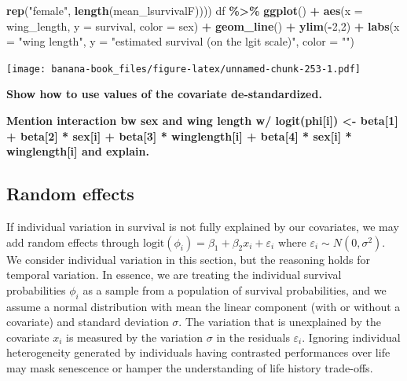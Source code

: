 \documentclass[
  12pt,
]{krantz}
\newenvironment{Shaded}{\begin{snugshade}}{\end{snugshade}}
\newcommand{\AttributeTok}[1]{\textcolor[rgb]{0.13,0.29,0.53}{#1}}
\newcommand{\DecValTok}[1]{\textcolor[rgb]{0.00,0.00,0.81}{#1}}
\newcommand{\FunctionTok}[1]{\textcolor[rgb]{0.13,0.29,0.53}{\textbf{#1}}}
\newcommand{\NormalTok}[1]{#1}
\newcommand{\SpecialCharTok}[1]{\textcolor[rgb]{0.81,0.36,0.00}{\textbf{#1}}}
\newcommand{\StringTok}[1]{\textcolor[rgb]{0.31,0.60,0.02}{#1}}
\begin{document}
\begin{Shaded}
\begin{Highlighting}[]
                         \FunctionTok{rep}\NormalTok{(}\StringTok{"female"}\NormalTok{, }\FunctionTok{length}\NormalTok{(mean\_lsurvivalF))))}
\NormalTok{df }\SpecialCharTok{\%\textgreater{}\%}
  \FunctionTok{ggplot}\NormalTok{() }\SpecialCharTok{+} 
  \FunctionTok{aes}\NormalTok{(}\AttributeTok{x =}\NormalTok{ wing\_length, }\AttributeTok{y =}\NormalTok{ survival, }\AttributeTok{color =}\NormalTok{ sex) }\SpecialCharTok{+} 
  \FunctionTok{geom\_line}\NormalTok{() }\SpecialCharTok{+} 
  \FunctionTok{ylim}\NormalTok{(}\SpecialCharTok{{-}}\DecValTok{2}\NormalTok{,}\DecValTok{2}\NormalTok{) }\SpecialCharTok{+} 
  \FunctionTok{labs}\NormalTok{(}\AttributeTok{x =} \StringTok{"wing length"}\NormalTok{, }
       \AttributeTok{y =} \StringTok{"estimated survival (on the lgit scale)"}\NormalTok{, }
       \AttributeTok{color =} \StringTok{""}\NormalTok{)}
\end{Highlighting}
\end{Shaded}

\texttt{[image: banana-book\_files/figure-latex/unnamed-chunk-253-1.pdf]}

\textbf{Show how to use values of the covariate de-standardized.}

\textbf{Mention interaction bw sex and wing length w/ logit(phi{[}i{]}) \textless- beta{[}1{]} + beta{[}2{]} * sex{[}i{]} + beta{[}3{]} * winglength{[}i{]} + beta{[}4{]} * sex{[}i{]} * winglength{[}i{]} and explain.}

\hypertarget{random-effects}{%
\subsection{Random effects}\label{random-effects}}

If individual variation in survival is not fully explained by our covariates, we may add random effects through \(\text{logit}(\phi_i) = \beta_1 + \beta_2 x_i + \varepsilon_i\) where \(\varepsilon_i \sim N(0,\sigma^2)\). We consider individual variation in this section, but the reasoning holds for temporal variation. In essence, we are treating the individual survival probabilities \(\phi_i\) as a sample from a population of survival probabilities, and we assume a normal distribution with mean the linear component (with or without a covariate) and standard deviation \(\sigma\). The variation that is unexplained by the covariate \(x_i\) is measured by the variation \(\sigma\) in the residuals \(\varepsilon_i\). Ignoring individual heterogeneity generated by individuals having contrasted performances over life may mask senescence or hamper the understanding of life history trade-offs.
\end{document}
